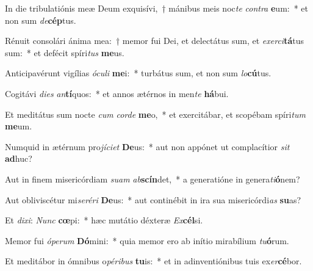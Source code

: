 \item In die tribulatiónis meæ Deum exquisívi,~† mánibus meis noc\textit{te} \textit{con}\textit{tra} \textbf{e}um:~* et non sum \textit{de}\textbf{cép}tus.
\item Rénuit consolári ánima mea:~† memor fui Dei, et delectátus sum, et \textit{ex}\textit{er}\textit{ci}\textbf{tá}tus sum:~* et defécit spíri\textit{tus} \textbf{me}us.
\item Anticipavérunt vigílias \textit{ó}\textit{cu}\textit{li} \textbf{me}i:~* turbátus sum, et non sum \textit{lo}\textbf{cú}tus.
\item Cogitávi \textit{di}\textit{es} \textit{an}\textbf{tí}quos:~* et annos ætérnos in men\textit{te} \textbf{há}bui.
\item Et meditátus sum nocte \textit{cum} \textit{cor}\textit{de} \textbf{me}o,~* et exercitábar, et scopébam spíri\textit{tum} \textbf{me}um.
\item Numquid in ætérnum pro\textit{jí}\textit{ci}\textit{et} \textbf{De}us:~* aut non appónet ut complacítior \textit{sit} \textbf{ad}huc?
\item Aut in finem misericórdiam \textit{su}\textit{am} \textit{ab}\textbf{scín}det,~* a generatióne in genera\textit{ti}\textbf{ó}nem?
\item Aut obliviscétur mi\textit{se}\textit{ré}\textit{ri} \textbf{De}us:~* aut continébit in ira sua misericórdi\textit{as} \textbf{su}as?
\item Et \textit{di}\textit{xi}: \textit{Nunc} \textbf{cœ}pi:~* hæc mutátio déxteræ \textit{Ex}\textbf{cél}si.
\item Memor fui \textit{ó}\textit{pe}\textit{rum} \textbf{Dó}mini:~* quia memor ero ab inítio mirabílium \textit{tu}\textbf{ó}rum.
\item Et meditábor in ómnibus o\textit{pé}\textit{ri}\textit{bus} \textbf{tu}is:~* et in adinventiónibus tuis ex\textit{er}\textbf{cé}bor.
